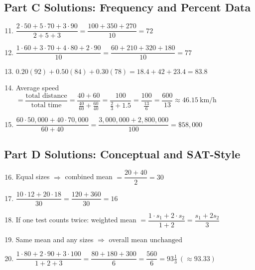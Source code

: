 \documentclass[12pt]{article}
\begin{document}
\subsection*{Part C Solutions: Frequency and Percent Data}
\begin{enumerate}
  \setcounter{enumi}{10}
  \item \(\dfrac{2\cdot50+5\cdot70+3\cdot90}{2+5+3}=\dfrac{100+350+270}{10}=\boxed{72}\)
  \item \(\dfrac{1\cdot60+3\cdot70+4\cdot80+2\cdot90}{10}=\dfrac{60+210+320+180}{10}=\boxed{77}\)
  \item \(0.20(92)+0.50(84)+0.30(78)=18.4+42+23.4=\boxed{83.8}\)
  \item Average speed \(=\dfrac{\text{total distance}}{\text{total time}}=\dfrac{40+60}{\tfrac{40}{60}+\tfrac{60}{40}}=\dfrac{100}{\tfrac{2}{3}+1.5}=\dfrac{100}{\tfrac{13}{6}}=\dfrac{600}{13}\approx\boxed{46.15\ \text{km/h}}\)
  \item \(\dfrac{60\cdot 50{,}000+40\cdot 70{,}000}{60+40}=\dfrac{3{,}000{,}000+2{,}800{,}000}{100}=\boxed{\$58{,}000}\)
\end{enumerate}

\subsection*{Part D Solutions: Conceptual and SAT-Style}
\begin{enumerate}
  \setcounter{enumi}{15}
  \item Equal sizes \(\Rightarrow\) combined mean \(=\dfrac{20+40}{2}=\boxed{30}\)
  \item \(\dfrac{10\cdot12+20\cdot18}{30}=\dfrac{120+360}{30}=\boxed{16}\)
  \item If one test counts twice: weighted mean \(=\dfrac{1\cdot s_1+2\cdot s_2}{1+2}=\boxed{\dfrac{s_1+2s_2}{3}}\)
  \item Same mean and any sizes \(\Rightarrow\) overall mean \(\boxed{\text{unchanged}}\)
  \item \(\dfrac{1\cdot80+2\cdot90+3\cdot100}{1+2+3}=\dfrac{80+180+300}{6}=\dfrac{560}{6}=\boxed{93\tfrac{1}{3}}\ (\approx \boxed{93.33})\)
\end{enumerate}
\end{document}
